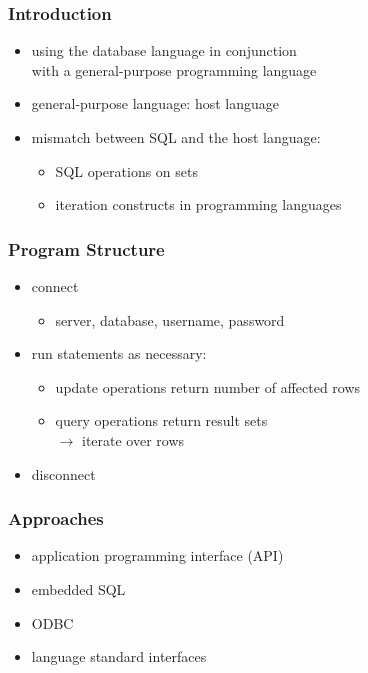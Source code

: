 \documentclass[dvipsnames]{beamer}
\theoremstyle{plain}
\begin{document}
\begin{frame}
  \frametitle{Introduction}

  \begin{itemize}
    \item using the database language in conjunction\\
      with a general-purpose programming language
    \item general-purpose language: \alert{host language}

    \pause
    \bigskip
    \item mismatch between SQL and the host language:
    \begin{itemize}
      \item SQL operations on sets
      \item iteration constructs in programming languages
    \end{itemize}
  \end{itemize}
\end{frame}

\begin{frame}
  \frametitle{Program Structure}

  \begin{itemize}
    \item connect
    \begin{itemize}
      \item server, database, username, password
    \end{itemize}

    \pause
    \medskip
    \item run statements as necessary:
    \begin{itemize}
      \item update operations return number of affected rows
      \item query operations return result sets\\
        $\rightarrow$ iterate over rows
    \end{itemize}

    \pause
    \medskip
    \item disconnect
  \end{itemize}
\end{frame}

\begin{frame}
  \frametitle{Approaches}

  \begin{itemize}
    \item application programming interface (API)
    \item embedded SQL
    \item ODBC
    \item language standard interfaces
  \end{itemize}
\end{frame}
\end{document}
